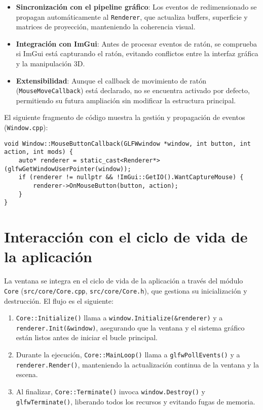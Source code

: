 \begin{itemize}
    \item \textbf{Sincronización con el pipeline gráfico}: Los eventos de redimensionado se propagan automáticamente al \texttt{Renderer}, que actualiza buffers, superficie y matrices de proyección, manteniendo la coherencia visual.
    \item \textbf{Integración con ImGui}: Antes de procesar eventos de ratón, se comprueba si ImGui está capturando el ratón, evitando conflictos entre la interfaz gráfica y la manipulación 3D.
    \item \textbf{Extensibilidad}: Aunque el callback de movimiento de ratón (\texttt{MouseMoveCallback}) está declarado, no se encuentra activado por defecto, permitiendo su futura ampliación sin modificar la estructura principal.
\end{itemize}

El siguiente fragmento de código muestra la gestión y propagación de eventos
(\texttt{Window.cpp}):

\begin{verbatim}
void Window::MouseButtonCallback(GLFWwindow *window, int button, int action, int mods) {
    auto* renderer = static_cast<Renderer*>(glfwGetWindowUserPointer(window));
    if (renderer != nullptr && !ImGui::GetIO().WantCaptureMouse) {
        renderer->OnMouseButton(button, action);
    }
}
\end{verbatim}

\section{Interacción con el ciclo de vida de la aplicación}

La ventana se integra en el ciclo de vida de la aplicación a través del módulo
\texttt{Core} (\texttt{src/core/Core.cpp}, \texttt{src/core/Core.h}), que
gestiona su inicialización y destrucción. El flujo es el siguiente:

\begin{enumerate}
    \item \texttt{Core::Initialize()} llama a \texttt{window.Initialize(&renderer)} y a \texttt{renderer.Init(&window)}, asegurando que la ventana y el sistema gráfico están listos antes de iniciar el bucle principal.
    \item Durante la ejecución, \texttt{Core::MainLoop()} llama a
          \texttt{glfwPollEvents()} y a \texttt{renderer.Render()}, manteniendo la
          actualización continua de la ventana y la escena.
    \item Al finalizar, \texttt{Core::Terminate()} invoca \texttt{window.Destroy()} y
          \texttt{glfwTerminate()}, liberando todos los recursos y evitando fugas de
          memoria.
\end{enumerate}

